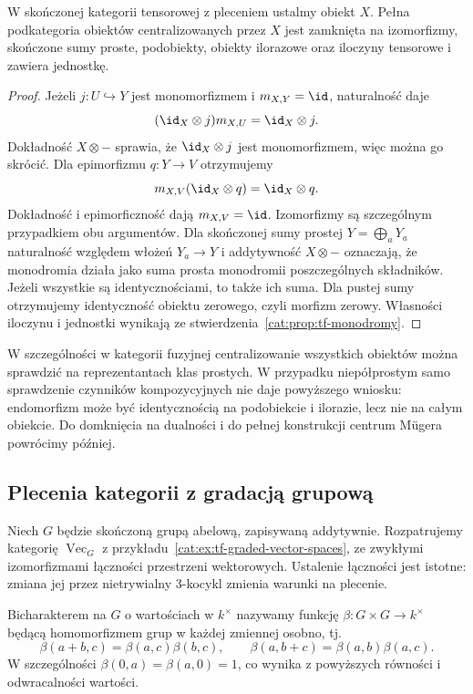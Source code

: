 \begin{stwierdzenie}\label{cat:prop:tf-centralizing-subquotients}
W skończonej kategorii tensorowej z pleceniem ustalmy obiekt $X$. Pełna podkategoria obiektów centralizowanych przez $X$ jest zamknięta na izomorfizmy, skończone sumy proste, podobiekty, obiekty ilorazowe oraz iloczyny tensorowe i zawiera jednostkę.
\end{stwierdzenie}
\begin{proof}
Jeżeli $j:U\hookrightarrow Y$ jest monomorfizmem i $m_{X,Y}=\id$, naturalność daje
\[
 (\id_X\otimes j)m_{X,U}=\id_X\otimes j.
\]
Dokładność $X\otimes-$ sprawia, że $\id_X\otimes j$ jest monomorfizmem, więc można go skrócić. Dla epimorfizmu $q:Y\to V$ otrzymujemy
\[
 m_{X,V}(\id_X\otimes q)=\id_X\otimes q.
\]
Dokładność i epimorficzność dają $m_{X,V}=\id$. Izomorfizmy są szczególnym przypadkiem obu argumentów. Dla skończonej sumy prostej $Y=\bigoplus_aY_a$ naturalność względem włożeń $Y_a\to Y$ i addytywność $X\otimes-$ oznaczają, że monodromia działa jako suma prosta monodromii poszczególnych składników. Jeżeli wszystkie są identycznościami, to także ich suma. Dla pustej sumy otrzymujemy identyczność obiektu zerowego, czyli morfizm zerowy. Własności iloczynu i jednostki wynikają ze stwierdzenia~\ref{cat:prop:tf-monodromy}.
\end{proof}

W szczególności w kategorii fuzyjnej centralizowanie wszystkich obiektów można sprawdzić na reprezentantach klas prostych. W przypadku niepółprostym samo sprawdzenie czynników kompozycyjnych nie daje powyższego wniosku: endomorfizm może być identycznością na podobiekcie i ilorazie, lecz nie na całym obiekcie. Do domknięcia na dualności i do pełnej konstrukcji centrum Mügera powrócimy później.

\subsection{Plecenia kategorii z gradacją grupową}

Niech $G$ będzie skończoną grupą abelową, zapisywaną addytywnie. Rozpatrujemy kategorię $\operatorname{Vec}_G$ z przykładu~\ref{cat:ex:tf-graded-vector-spaces}, ze zwykłymi izomorfizmami łączności przestrzeni wektorowych. Ustalenie łączności jest istotne: zmiana jej przez nietrywialny 3-kocykl zmienia warunki na plecenie.

\begin{definicja}[Bicharakter]\label{cat:def:tf-bicharacter}
Bicharakterem na $G$ o wartościach w $k^\times$ nazywamy funkcję $\beta:G\times G\to k^\times$ będącą homomorfizmem grup w każdej zmiennej osobno, tj.
\[
 \beta(a+b,c)=\beta(a,c)\beta(b,c),\qquad
 \beta(a,b+c)=\beta(a,b)\beta(a,c).
\]
W szczególności $\beta(0,a)=\beta(a,0)=1$, co wynika z powyższych równości i odwracalności wartości.
\end{definicja}

